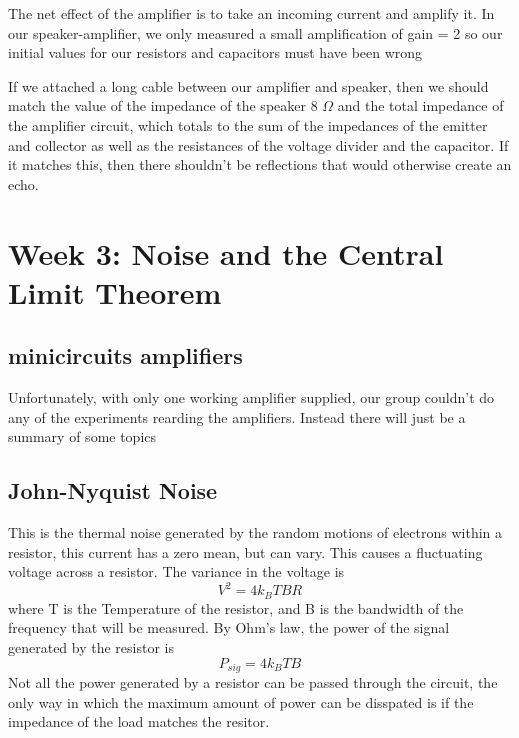 \documentclass[12 pt]{article}
\begin{document}
The net effect of the amplifier is to take an incoming current and
amplify it. In our speaker-amplifier, we only measured a small
amplification of gain = 2 so our initial values for our resistors and
capacitors must have been wrong

If we attached a long cable between our amplifier and speaker, then we
should match the value of the impedance of the speaker 8 $\Omega$ and
the total impedance of the amplifier circuit, which totals to the sum of
the impedances of the emitter and collector as well as the resistances
of the voltage divider and the capacitor. If it matches this, then there
shouldn't be reflections that would otherwise create an echo.

\section{Week 3: Noise and the Central Limit Theorem}
\subsection{minicircuits amplifiers}
Unfortunately, with only one working amplifier supplied, our group
couldn't do any of the experiments rearding the amplifiers. Instead
there will just be a summary of some topics

\subsection{John-Nyquist Noise}
This is the thermal noise generated by the random motions of electrons
within a resistor, this current has a zero mean, but can vary. This
causes a fluctuating voltage across a resistor. The variance in the
voltage is 
\begin{equation}
  \label{variance}
  V^2 = 4k_BTBR
\end{equation}
where T is the Temperature of the resistor, and B is the bandwidth of the
frequency that will be measured.
By Ohm's law, the power of the signal generated by the resistor is 
\begin{equation}
  \label{power}
  P_{sig} = 4k_BTB
\end{equation}
Not all the power generated by a resistor can be passed through the
circuit, the only way in which the maximum amount of power can be
disspated is if the impedance of the load matches the resitor. 
\end{document}
